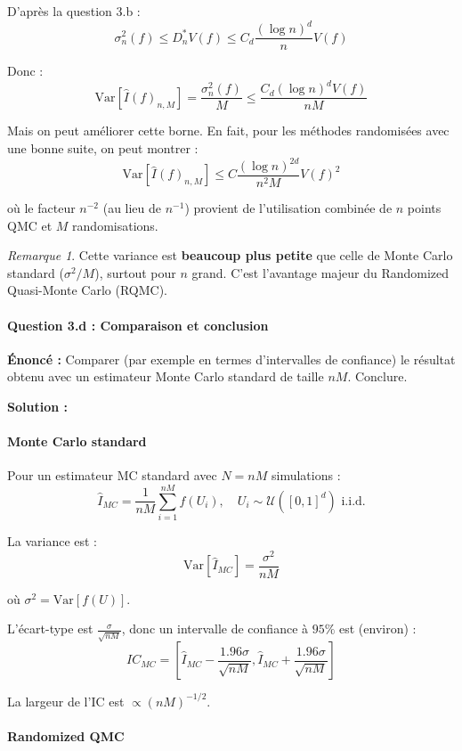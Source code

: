 \documentclass[12pt,a4paper]{article}
\theoremstyle{definition}
\theoremstyle{remark}
\newtheorem*{remark}{Remarque}
\newcommand{\Var}{\text{Var}}
\begin{document}
D'après la question 3.b :
\[
\sigma_n^2(f) \leq D_n^* V(f) \leq C_d \frac{(\log n)^d}{n} V(f)
\]

Donc :
\[
\Var[\hat{I}(f)_{n,M}] = \frac{\sigma_n^2(f)}{M} \leq \frac{C_d (\log n)^d V(f)}{nM}
\]

Mais on peut améliorer cette borne. En fait, pour les méthodes randomisées avec une bonne suite, on peut montrer :
\[
\Var[\hat{I}(f)_{n,M}] \leq C \frac{(\log n)^{2d}}{n^2 M} V(f)^2
\]

où le facteur $n^{-2}$ (au lieu de $n^{-1}$) provient de l'utilisation combinée de $n$ points QMC et $M$ randomisations.

\begin{remark}
Cette variance est \textbf{beaucoup plus petite} que celle de Monte Carlo standard ($\sigma^2/M$), surtout pour $n$ grand. C'est l'avantage majeur du Randomized Quasi-Monte Carlo (RQMC).
\end{remark}

\paragraph{Question 3.d : Comparaison et conclusion}

\textbf{Énoncé :} Comparer (par exemple en termes d'intervalles de confiance) le résultat obtenu avec un estimateur Monte Carlo standard de taille $nM$. Conclure.

\textbf{Solution :}

\paragraph{Monte Carlo standard}

Pour un estimateur MC standard avec $N = nM$ simulations :
\[
\hat{I}_{MC} = \frac{1}{nM}\sum_{i=1}^{nM} f(U_i), \quad U_i \sim \mathcal{U}([0,1]^d) \text{ i.i.d.}
\]

La variance est :
\[
\Var[\hat{I}_{MC}] = \frac{\sigma^2}{nM}
\]

où $\sigma^2 = \Var[f(U)]$.

L'écart-type est $\frac{\sigma}{\sqrt{nM}}$, donc un intervalle de confiance à $95\%$ est (environ) :
\[
IC_{MC} = \left[\hat{I}_{MC} - \frac{1.96\sigma}{\sqrt{nM}}, \hat{I}_{MC} + \frac{1.96\sigma}{\sqrt{nM}}\right]
\]

La largeur de l'IC est $\propto (nM)^{-1/2}$.

\paragraph{Randomized QMC}
\end{document}

